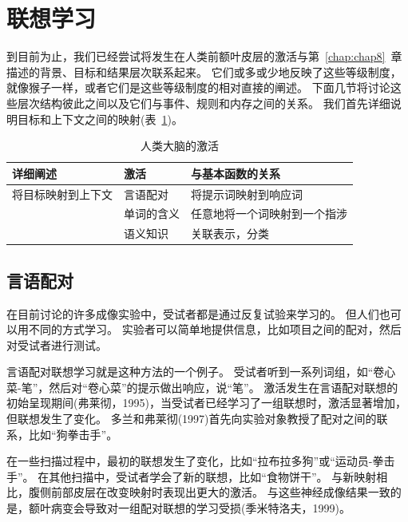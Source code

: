 \section{联想学习}
\par

到目前为止，我们已经尝试将发生在人类前额叶皮层的激活与第~\ref{chap:chap8}~章描述的背景、目标和结果层次联系起来。
它们或多或少地反映了这些等级制度，就像猴子一样，或者它们是这些等级制度的相对直接的阐述。
下面几节将讨论这些层次结构彼此之间以及它们与事件、规则和内存之间的关系。
我们首先详细说明目标和上下文之间的映射(表~\ref{tab:9_6})。


\begin{table}[htbp] 
	\newcommand{\tabincell}[2]{\begin{tabular}{@{}#1@{}}#2\end{tabular}} %
	\centering
	\caption{人类大脑的激活\label{tab:9_6}}
	\renewcommand\arraystretch{1.5}	%
	\begin{tabular}{lll}
		\toprule
		详细阐述 & 激活 & 与基本函数的关系\\
		\midrule
		将目标映射到上下文 & 言语配对 & 将提示词映射到响应词  \\
		& 单词的含义 & 任意地将一个词映射到一个指涉 \\
		& 语义知识 & 关联表示，分类 \\
		\bottomrule
		
	\end{tabular}%
\end{table}%



\subsection{言语配对}
\par
在目前讨论的许多成像实验中，受试者都是通过反复试验来学习的。
但人们也可以用不同的方式学习。
实验者可以简单地提供信息，比如项目之间的配对，然后对受试者进行测试。
\par


言语配对联想学习就是这种方法的一个例子。
受试者听到一系列词组，如“卷心菜-笔”，然后对“卷心菜”的提示做出响应，说“笔”。
激活发生在言语配对联想的初始呈现期间(弗莱彻，1995)，当受试者已经学习了一组联想时，激活显著增加，但联想发生了变化。
多兰和弗莱彻(1997)首先向实验对象教授了配对之间的联系，比如“狗拳击手”。
\par


在一些扫描过程中，最初的联想发生了变化，比如“拉布拉多狗”或“运动员-拳击手”。
在其他扫描中，受试者学会了新的联想，比如“食物饼干”。
与新映射相比，腹侧前部皮层在改变映射时表现出更大的激活。
与这些神经成像结果一致的是，额叶病变会导致对一组配对联想的学习受损(季米特洛夫，1999)。
\par


